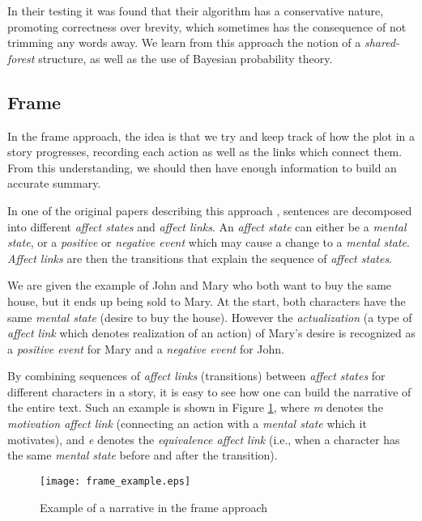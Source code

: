 In their testing it was found that their algorithm has a conservative nature, promoting correctness over brevity, which sometimes has the consequence of not trimming any words away. We learn from this approach the notion of a \textit{shared-forest} structure, as well as the use of Bayesian probability theory.

\subsection{Frame}

In the frame approach, the idea is that we try and keep track of how the plot in a story progresses, recording each action as well as the links which connect them. From this understanding, we should then have enough information to build an accurate summary.

\mbox{}

In one of the original papers describing this approach \cite{lehnert_1980_nodate}, sentences are decomposed into different \textit{affect states} and \textit{affect links}. An \textit{affect state} can either be a \textit{mental state}, or a \textit{positive} or \textit{negative event} which may cause a change to a \textit{mental state}. \textit{Affect links} are then the transitions that explain the sequence of \textit{affect states}.

We are given the example of John and Mary who both want to buy the same house, but it ends up being sold to Mary. At the start, both characters have the same \textit{mental state} (desire to buy the house). However the \textit{actualization} (a type of \textit{affect link} which denotes realization of an action) of Mary's desire is recognized as a \textit{positive event} for Mary and a \textit{negative event} for John.

By combining sequences of \textit{affect links} (transitions) between \textit{affect states} for different characters in a story, it is easy to see how one can build the narrative of the entire text. Such an example is shown in Figure \ref{fig:frame_example}, where \textit{m} denotes the \textit{motivation affect link} (connecting an action with a \textit{mental state} which it motivates), and \textit{e} denotes the \textit{equivalence affect link} (i.e., when a character has the same \textit{mental state} before and after the transition).

\begin{figure}[H]
\centering
\texttt{[image: frame\_example.eps]}
\caption{\cite{lehnert_1980_nodate} Example of a narrative in the frame approach}
\label{fig:frame_example}
\end{figure}

